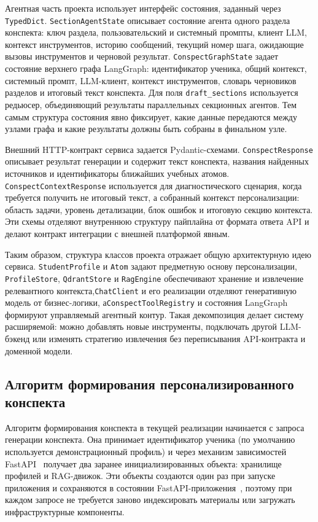 \documentclass[a4paper,12pt]{extarticle}
\begin{document}
Агентная часть проекта использует интерфейс состояния, заданный через \texttt{TypedDict}.
\texttt{SectionAgentState} описывает состояние агента одного раздела конспекта:
ключ раздела, пользовательский и системный промпты, клиент LLM, контекст инструментов,
историю сообщений, текущий номер шага, ожидающие вызовы инструментов и черновой
результат. \texttt{ConspectGraphState} задает состояние верхнего графа LangGraph:
идентификатор ученика, общий контекст, системный промпт, LLM-клиент, контекст
инструментов, словарь черновиков разделов и итоговый текст конспекта. Для поля
\texttt{draft\_sections} используется редьюсер, объединяющий результаты параллельных
секционных агентов. Тем самым структура состояния явно фиксирует, какие данные
передаются между узлами графа и какие результаты должны быть собраны в финальном
узле.

Внешний HTTP-контракт сервиса задается Pydantic-схемами. \texttt{ConspectResponse}
описывает результат генерации и содержит текст конспекта, названия найденных
источников и идентификаторы ближайших учебных атомов. \texttt{ConspectContextResponse}
используется для диагностического сценария, когда требуется получить не итоговый
текст, а собранный контекст персонализации: область задачи, уровень детализации,
блок ошибок и итоговую секцию контекста. Эти схемы
отделяют внутреннюю структуру пайплайна от формата ответа API и делают контракт
интеграции с внешней платформой явным.

Таким образом, структура классов проекта отражает общую архитектурную идею сервиса.
\texttt{StudentProfile} и \texttt{Atom} задают предметную основу персонализации,
\texttt{ProfileStore}, \texttt{QdrantStore} и \texttt{RagEngine} обеспечивают хранение
и извлечение релевантного контекста,\break \texttt{ChatClient} и его реализации отделяют
генеративную модель от бизнес-логики, а\break \texttt{ConspectToolRegistry} и состояния
LangGraph формируют управляемый агентный контур. Такая декомпозиция делает систему
расширяемой: можно добавлять новые инструменты, подключать другой LLM-бэкенд или
изменять стратегию извлечения без переписывания API-контракта и доменной модели.

\subsection{Алгоритм формирования персонализированного конспекта}

Алгоритм формирования конспекта в текущей реализации начинается с запроса 
генерации конспекта. Она принимает идентификатор ученика
(по умолчанию используется демонстрационный профиль) и через механизм
зависимостей FastAPI~\cite{fastapi2026} получает два заранее инициализированных объекта: хранилище
профилей и RAG-движок. Эти объекты создаются
один раз при запуске приложения и сохраняются в состоянии FastAPI-приложения~\cite{fastapi2026}, поэтому
при каждом запросе не требуется заново индексировать материалы или загружать
инфраструктурные компоненты.
\end{document}
